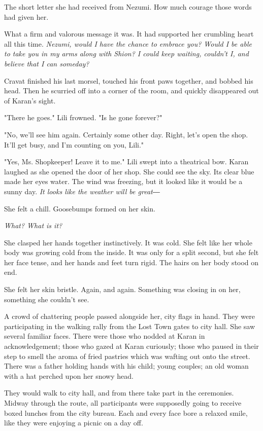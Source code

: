 
The short letter she had received from Nezumi. How much courage those
words had given her.


What a firm and valorous message it was. It had supported her crumbling
heart all this time. \emph{Nezumi, would I have the chance to embrace you?
	Would I be able to take you in my arms along with Shion? I could keep
	waiting, couldn't I, and believe that I can someday?}

Cravat finished his last morsel, touched his front paws together, and
bobbed his head. Then he scurried off into a corner of the room, and
quickly disappeared out of Karan's sight.

"There he goes." Lili frowned. "Is he gone forever?"

"No, we'll see him again. Certainly some other day. Right, let's open
the shop. It'll get busy, and I'm counting on you, Lili."

"Yes, Ms. Shopkeeper! Leave it to me." Lili swept into a theatrical bow.
Karan laughed as she opened the door of her shop. She could see the sky.
Its clear blue made her eyes water. The wind was freezing, but it looked
like it would be a sunny day. \emph{It looks like the weather will be great―}

She felt a chill. Goosebumps formed on her skin.

\emph{What? What is it?}

She clasped her hands together instinctively. It was cold. She felt like
her whole body was growing cold from the inside. It was only for a split
second, but she felt her face tense, and her hands and feet turn rigid.
The hairs on her body stood on end.

She felt her skin bristle. Again, and again. Something was closing in on
her, something she couldn't see.

A crowd of chattering people passed alongside her, city flags in hand.
They were participating in the walking rally from the Lost Town gates to
city hall. She saw several familiar faces. There were those who nodded
at Karan in acknowledgement; those who gazed at Karan curiously; those
who paused in their step to smell the aroma of fried pastries which was
wafting out onto the street. There was a father holding hands with his
child; young couples; an old woman with a hat perched upon her snowy
head.

They would walk to city hall, and from there take part in the
ceremonies. Midway through the route, all participants were supposedly
going to receive boxed lunches from the city bureau. Each and every face
bore a relaxed smile, like they were enjoying a picnic on a day off.

